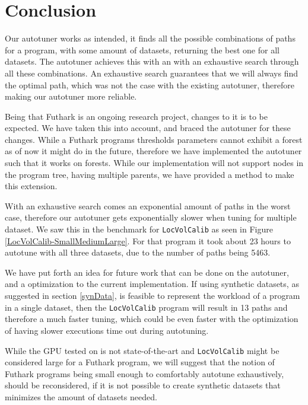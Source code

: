 \section{Conclusion}
\label{conclusion}
Our autotuner works as intended, it finds all the possible combinations of paths for a program, with some amount of datasets, returning the best one for all datasets. The autotuner achieves this with an with an exhaustive search through all these combinations. An exhaustive search guarantees that we will always find the optimal path, which was not the case with the existing autotuner, therefore making our autotuner more reliable.

Being that Futhark is an ongoing research project, changes to it is to be expected. We have taken this into account, and braced the autotuner for these changes. While a Futhark programs thresholds parameters cannot exhibit a forest as of now it might do in the future, therefore we have implemented the autotuner such that it works on forests. While our implementation will not support nodes in the program tree, having multiple parents, we have provided a method to make this extension.

With an exhaustive search comes an exponential amount of paths in the worst case, therefore our autotuner gets exponentially slower when tuning for multiple dataset. We saw this in the benchmark for \texttt{LocVolCalib} as seen in Figure \ref{LocVolCalib-SmallMediumLarge}. For that program it took about 23 hours to autotune with all three datasets, due to the number of paths being 5463. 

We have put forth an idea for future work that can be done on the autotuner, and a optimization to the current implementation. If using synthetic datasets, as suggested in section \ref{synData}, is feasible to represent the workload of a program in a single dataset, then the \texttt{LocVolCalib} program will result in 13 paths and therefore a much faster tuning, which could be even faster with the optimization of having slower executions time out during autotuning.

While the GPU tested on is not state-of-the-art and \texttt{LocVolCalib} might be considered large for a Futhark program, we will suggest that the notion of Futhark programs being small enough to comfortably autotune exhaustively, should be reconsidered, if it is not possible to create synthetic datasets that minimizes the amount of datasets needed. 
